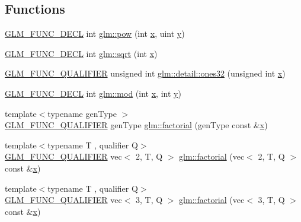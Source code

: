 \subsection*{Functions}
\begin{DoxyCompactItemize}
\item 
\hyperlink{setup_8hpp_ab2d052de21a70539923e9bcbf6e83a51}{G\+L\+M\+\_\+\+F\+U\+N\+C\+\_\+\+D\+E\+CL} int \hyperlink{group__gtx__integer_ga4937910d5d82dfd9c4bab3da7ff75399}{glm\+::pow} (int \hyperlink{_s_d_l__opengl_8h_ad0e63d0edcdbd3d79554076bf309fd47}{x}, uint \hyperlink{_s_d_l__opengl_8h_a1675d9d7bb68e1657ff028643b4037e3}{y})
\item 
\hyperlink{setup_8hpp_ab2d052de21a70539923e9bcbf6e83a51}{G\+L\+M\+\_\+\+F\+U\+N\+C\+\_\+\+D\+E\+CL} int \hyperlink{group__gtx__integer_ga78e2e68330e91d350fcfc2f4831cad12}{glm\+::sqrt} (int \hyperlink{_s_d_l__opengl_8h_ad0e63d0edcdbd3d79554076bf309fd47}{x})
\item 
\hyperlink{setup_8hpp_a33fdea6f91c5f834105f7415e2a64407}{G\+L\+M\+\_\+\+F\+U\+N\+C\+\_\+\+Q\+U\+A\+L\+I\+F\+I\+ER} unsigned int \hyperlink{namespaceglm_1_1detail_a2699e3b3ea6ad8d4bb99aed56761582c}{glm\+::detail\+::ones32} (unsigned int \hyperlink{_s_d_l__opengl_8h_ad0e63d0edcdbd3d79554076bf309fd47}{x})
\item 
\hyperlink{setup_8hpp_ab2d052de21a70539923e9bcbf6e83a51}{G\+L\+M\+\_\+\+F\+U\+N\+C\+\_\+\+D\+E\+CL} int \hyperlink{group__gtx__integer_gab9d22df91aac4d9eb925a4910f556f1b}{glm\+::mod} (int \hyperlink{_s_d_l__opengl_8h_ad0e63d0edcdbd3d79554076bf309fd47}{x}, int \hyperlink{_s_d_l__opengl_8h_a1675d9d7bb68e1657ff028643b4037e3}{y})
\item 
{\footnotesize template$<$typename gen\+Type $>$ }\\\hyperlink{setup_8hpp_a33fdea6f91c5f834105f7415e2a64407}{G\+L\+M\+\_\+\+F\+U\+N\+C\+\_\+\+Q\+U\+A\+L\+I\+F\+I\+ER} gen\+Type \hyperlink{group__gtx__integer_ga8cbd3120905f398ec321b5d1836e08fb}{glm\+::factorial} (gen\+Type const \&\hyperlink{_s_d_l__opengl_8h_ad0e63d0edcdbd3d79554076bf309fd47}{x})
\item 
{\footnotesize template$<$typename T , qualifier Q$>$ }\\\hyperlink{setup_8hpp_a33fdea6f91c5f834105f7415e2a64407}{G\+L\+M\+\_\+\+F\+U\+N\+C\+\_\+\+Q\+U\+A\+L\+I\+F\+I\+ER} vec$<$ 2, T, Q $>$ \hyperlink{namespaceglm_af73a83e2217df256752550778ff86955}{glm\+::factorial} (vec$<$ 2, T, Q $>$ const \&\hyperlink{_s_d_l__opengl_8h_ad0e63d0edcdbd3d79554076bf309fd47}{x})
\item 
{\footnotesize template$<$typename T , qualifier Q$>$ }\\\hyperlink{setup_8hpp_a33fdea6f91c5f834105f7415e2a64407}{G\+L\+M\+\_\+\+F\+U\+N\+C\+\_\+\+Q\+U\+A\+L\+I\+F\+I\+ER} vec$<$ 3, T, Q $>$ \hyperlink{namespaceglm_a786538577ea2e09359200d2500791041}{glm\+::factorial} (vec$<$ 3, T, Q $>$ const \&\hyperlink{_s_d_l__opengl_8h_ad0e63d0edcdbd3d79554076bf309fd47}{x})

\end{DoxyCompactItemize}
